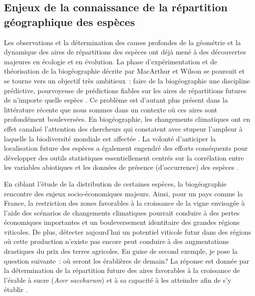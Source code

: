 \subsection*{Enjeux de la connaissance de la répartition géographique
des
espèces}\label{enjeux-de-la-connaissance-de-la-ruxe9partition-guxe9ographique-des-espuxe8ces}

Les observations et la détermination des causes profondes de la
géométrie et la dynamique des aires de répartitions des espèces ont déjà
mené à des découvertes majeures en écologie et en évolution. La phase
d'expérimentation et de théorisation de la biogéographie décrite par
MacArthur et Wilson se poursuit et se tourne vers un objectif très
ambitieux~: faire de la biogéographie une discipline prédictive,
pourvoyeuse de prédictions fiables sur les aires de répartitions futures
de n'importe quelle espèce \citep{Mouquet2015, Warren2015}. Ce problème
est d'autant plus présent dans la littérature récente que nous sommes
dans un contexte où ces aires sont profondément bouleversées. En
biogéographie, les changements climatiques ont en effet canalisé
l'attention des chercheurs qui constatent avec stupeur l'ampleur à
laquelle la biodiversité mondiale est affectée
\citep{Koh2004, Bellard2012}. La volonté d'anticiper la localisation
future des espèces a également engendré des efforts conséquents pour
développer des outils statistiques essentiellement centrés sur la
corrélation entre les variables abiotiques et les données de présence
(d'occurrence) des espèces \citep{Elith2006}.

En ciblant l'étude de la distribution de certaines espèces, la
biogéographie rencontre des enjeux socio-économiques majeurs. Ainsi,
pour un pays comme la France, la restriction des zones favorables à la
croissance de la vigne envisagée à l'aide des scénarios de changements
climatiques \citep{Hannah2013} pourrait conduire à des pertes
économiques importantes et un bouleversement identitaire des grandes
régions viticoles. De plus, détecter aujourd'hui un potentiel viticole
futur dans des régions où cette production n'existe pas encore peut
conduire à des augmentations drastiques du prix des terres agricoles. En
guise de second exemple, je pose la question suivante~: où seront les
érablières de demain? La réponse est donnée par la détermination de la
répartition future des aires favorables à la croissance de l'érable à
sucre (\emph{Acer saccharum}) et à sa capacité à les atteindre afin de
s'y établir \citep{Solarik2016}.


